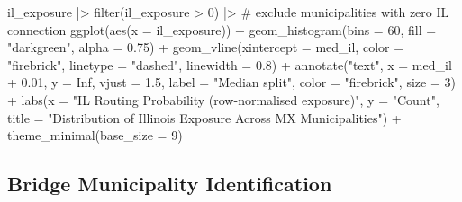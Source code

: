 \documentclass[
  11pt,
  letterpaper,
  DIV=11,
  numbers=noendperiod]{scrartcl}
\newenvironment{Shaded}{}{}
\newcommand{\AttributeTok}[1]{\textcolor[rgb]{0.84,0.23,0.29}{#1}}
\newcommand{\CommentTok}[1]{\textcolor[rgb]{0.42,0.45,0.49}{#1}}
\newcommand{\ConstantTok}[1]{\textcolor[rgb]{0.00,0.36,0.77}{#1}}
\newcommand{\DecValTok}[1]{\textcolor[rgb]{0.00,0.36,0.77}{#1}}
\newcommand{\FloatTok}[1]{\textcolor[rgb]{0.00,0.36,0.77}{#1}}
\newcommand{\FunctionTok}[1]{\textcolor[rgb]{0.44,0.26,0.76}{#1}}
\newcommand{\NormalTok}[1]{\textcolor[rgb]{0.14,0.16,0.18}{#1}}
\newcommand{\SpecialCharTok}[1]{\textcolor[rgb]{0.00,0.36,0.77}{#1}}
\newcommand{\StringTok}[1]{\textcolor[rgb]{0.01,0.18,0.38}{#1}}
\begin{document}
\begin{Shaded}
\end{Shaded}

\begin{Shaded}
\begin{Highlighting}[]
\NormalTok{il\_exposure }\SpecialCharTok{|\textgreater{}}
  \FunctionTok{filter}\NormalTok{(il\_exposure }\SpecialCharTok{\textgreater{}} \DecValTok{0}\NormalTok{) }\SpecialCharTok{|\textgreater{}}    \CommentTok{\# exclude municipalities with zero IL connection}
  \FunctionTok{ggplot}\NormalTok{(}\FunctionTok{aes}\NormalTok{(}\AttributeTok{x =}\NormalTok{ il\_exposure)) }\SpecialCharTok{+}
  \FunctionTok{geom\_histogram}\NormalTok{(}\AttributeTok{bins =} \DecValTok{60}\NormalTok{, }\AttributeTok{fill =} \StringTok{"darkgreen"}\NormalTok{, }\AttributeTok{alpha =} \FloatTok{0.75}\NormalTok{) }\SpecialCharTok{+}
  \FunctionTok{geom\_vline}\NormalTok{(}\AttributeTok{xintercept =}\NormalTok{ med\_il, }\AttributeTok{color =} \StringTok{"firebrick"}\NormalTok{,}
             \AttributeTok{linetype =} \StringTok{"dashed"}\NormalTok{, }\AttributeTok{linewidth =} \FloatTok{0.8}\NormalTok{) }\SpecialCharTok{+}
  \FunctionTok{annotate}\NormalTok{(}\StringTok{"text"}\NormalTok{, }\AttributeTok{x =}\NormalTok{ med\_il }\SpecialCharTok{+} \FloatTok{0.01}\NormalTok{, }\AttributeTok{y =} \ConstantTok{Inf}\NormalTok{, }\AttributeTok{vjust =} \FloatTok{1.5}\NormalTok{,}
           \AttributeTok{label =} \StringTok{"Median split"}\NormalTok{, }\AttributeTok{color =} \StringTok{"firebrick"}\NormalTok{, }\AttributeTok{size =} \DecValTok{3}\NormalTok{) }\SpecialCharTok{+}
  \FunctionTok{labs}\NormalTok{(}\AttributeTok{x =} \StringTok{"IL Routing Probability (row{-}normalised exposure)"}\NormalTok{,}
       \AttributeTok{y =} \StringTok{"Count"}\NormalTok{,}
       \AttributeTok{title =} \StringTok{"Distribution of Illinois Exposure Across MX Municipalities"}\NormalTok{) }\SpecialCharTok{+}
  \FunctionTok{theme\_minimal}\NormalTok{(}\AttributeTok{base\_size =} \DecValTok{9}\NormalTok{)}
\end{Highlighting}
\end{Shaded}

\subsection{Bridge Municipality
Identification}\label{bridge-municipality-identification}
\end{document}
